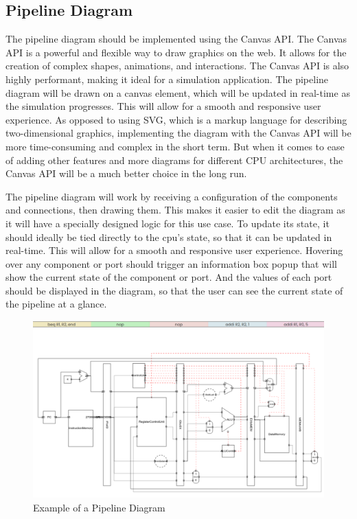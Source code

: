 \subsection{Pipeline Diagram}
The pipeline diagram should be implemented using the Canvas API. The Canvas API is a powerful and flexible way to draw graphics on the web. It allows for the creation of complex shapes, animations, and interactions. The Canvas API is also highly performant, making it ideal for a simulation application. The pipeline diagram will be drawn on a canvas element, which will be updated in real-time as the simulation progresses. This will allow for a smooth and responsive user experience. 
As opposed to using SVG, which is a markup language for describing two-dimensional graphics, implementing the diagram with the Canvas API will be more time-consuming and complex in the short term. But when it comes to ease of adding other features and more diagrams for different CPU architectures, the Canvas API will be a much better choice in the long run.

The pipeline diagram will work by receiving a configuration of the components and connections, then drawing them. This makes it easier to edit the diagram as it will have a specially designed logic for this use case. To update its state, it should ideally be tied directly to the cpu's state, so that it can be updated in real-time. This will allow for a smooth and responsive user experience. Hovering over any component or port should trigger an information box popup that will show the current state of the component or port. And the values of each port should be displayed in the diagram, so that the user can see the current state of the pipeline at a glance.

\begin{figure}[H]
    \centering
    \includegraphics[width=1\textwidth]{assets/images/pipeline_diagram_example.png}
    \caption{Example of a Pipeline Diagram}
    \label{fig:pipeline_diagram_example}
\end{figure}

